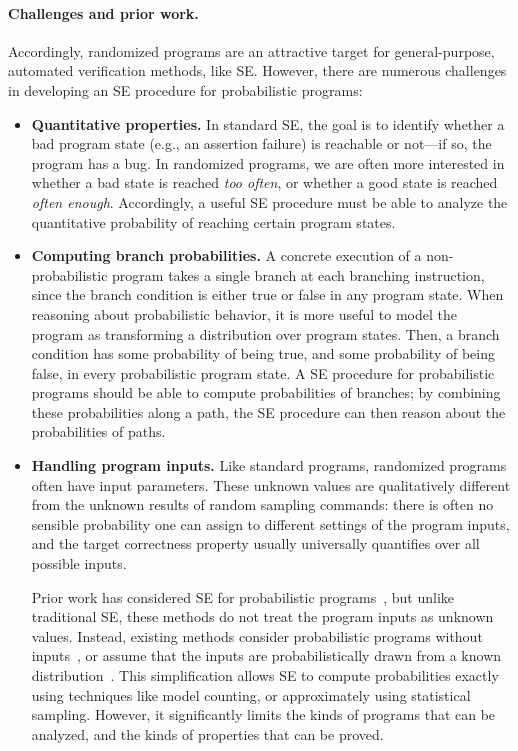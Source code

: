 \documentclass[acmsmall,review,anonymous]{acmart}\settopmatter{printfolios=true,printccs=false,printacmref=false}
\begin{document}
\paragraph*{Challenges and prior work.} 
Accordingly, randomized programs are an attractive target for general-purpose,
automated verification methods, like SE. However, there are numerous challenges
in developing an SE procedure for probabilistic programs:
% 
\begin{itemize}
\item \textbf{Quantitative properties.} In standard SE, the goal is to
  identify whether a bad program state (e.g., an assertion failure) is
  reachable or not---if so, the program has a bug. In randomized programs, we
  are often more interested in whether a bad state is reached \emph{too
    often}, or whether a good state is reached \emph{often enough}. Accordingly,
  a useful SE procedure must be able to analyze the quantitative probability
  of reaching certain program states.
\item \textbf{Computing branch probabilities.} A concrete execution of a
  non-probabilistic program takes a single branch at each branching
  instruction, since the branch condition is either true or false in any
  program state. When reasoning about probabilistic behavior, it is more
  useful to model the program as transforming a distribution over program
  states. Then, a branch condition has some probability of being true, and
  some probability of being false, in every probabilistic program state. A SE
  procedure for probabilistic programs should be able to compute probabilities
  of branches; by combining these probabilities along a path, the SE procedure
  can then reason about the probabilities of paths.
\item \textbf{Handling program inputs.} Like standard programs, randomized
  programs often have input parameters. These unknown values are qualitatively
  different from the unknown results of random sampling commands: there is
  often no sensible probability one can assign to different settings of the
  program inputs, and the target correctness property usually universally
  quantifies over all possible inputs.

  Prior work has considered SE for probabilistic programs~\citep{geldenhuys_2012,sampson_2014},
  but unlike traditional SE, these methods do not treat the program inputs as
  unknown values. Instead, existing methods consider probabilistic programs
  without inputs~\citep{sampson_2014}, or assume that the inputs are
  probabilistically drawn from a known distribution~\citep{geldenhuys_2012}. This
  simplification allows SE to compute probabilities exactly using techniques
  like model counting, or approximately using statistical sampling. However,
  it significantly limits the kinds of programs that can be analyzed, and the
  kinds of properties that can be proved.
\end{itemize}
\end{document}
